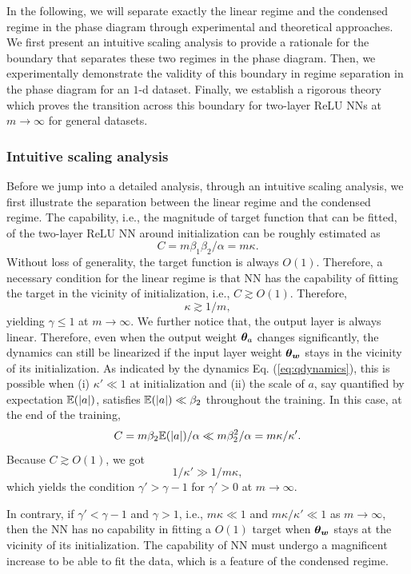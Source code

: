 \documentclass[twoside,11pt]{article}
\begin{document}
In the following, we will separate exactly the linear regime and the condensed regime in the phase diagram through experimental and theoretical approaches. We first present an intuitive scaling analysis to provide a rationale for the boundary that separates these two regimes in the phase diagram. Then, we experimentally demonstrate the validity of this boundary in regime separation in the phase diagram for an $1$-d dataset. Finally, we establish a rigorous theory which proves the transition across this boundary for two-layer ReLU NNs at $m\to\infty$ for general datasets.

\subsubsection{Intuitive scaling analysis}
Before we jump into a detailed analysis, through an intuitive scaling analysis, we first illustrate the separation between the linear regime and the condensed regime. The capability, i.e., the magnitude of target function that can be fitted, of the two-layer ReLU NN around initialization can be roughly estimated as
\[
    C = m \beta_1 \beta_2/\alpha=m\kappa.
\]
Without loss of generality, the target function is always $O(1)$. Therefore, a necessary condition for the linear regime is that NN has the capability of fitting the target in the vicinity of initialization, i.e., $C \gtrsim O(1)$. Therefore,
\[
    \kappa \gtrsim 1/m,
\]
yielding $\gamma\leq1$ at $m\to\infty$. We further notice that, the output layer is always linear. Therefore, even when the output weight $\bm{\theta}_{a}$ changes significantly, the dynamics can still be linearized if the input layer weight $\bm{\theta}_{\bm{w}}$ stays in the vicinity of its initialization. As indicated by the dynamics Eq. (\ref{eq:qdynamics}), this is possible when (i) $\kappa' \ll 1$ at initialization and (ii) the scale of $a$, say quantified by expectation $\mathbb{E}(|a|)$, satisfies $\mathbb{E}(|a|) \ll \beta_2$ throughout the training.  In this case, at the end of the training,
\begin{equation}
    C = m\beta_2 \mathbb{E}(|a|)/\alpha  \ll m\beta_2^2/\alpha=m\kappa/\kappa'.
\end{equation}
Because $C \gtrsim O(1)$, we got
\begin{equation}
    1/\kappa'\gg 1/m\kappa,
\end{equation}
which yields the condition $\gamma'>\gamma-1$ for $\gamma'>0$ at $m\to\infty$. 

In contrary, if $\gamma'<\gamma-1$ and $\gamma>1$, i.e., $m\kappa\ll 1$ and $m\kappa/\kappa'\ll 1$ as $m\to\infty$, then the NN has no capability in fitting a $O(1)$ target when $\bm{\theta}_{\bm{w}}$ stays at the vicinity of its initialization. The capability of NN must undergo a magnificent increase to be able to fit the data, which is a feature of the condensed regime.
\end{document}
